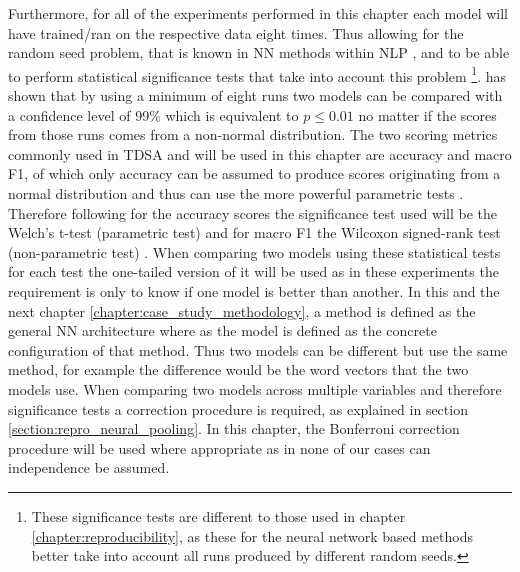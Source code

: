Furthermore, for all of the experiments performed in this chapter each model will have trained/ran on the respective data eight times. Thus allowing for the random seed problem, that is known in NN methods within NLP \citep{reimers-gurevych-2017-reporting}, and to be able to perform statistical significance tests that take into account this problem \citep{reimers2018comparing}\footnote{These significance tests are different to those used in chapter \ref{chapter:reproducibility}, as these for the neural network based methods better take into account all runs produced by different random seeds.}. \citet{reimers2018comparing} has shown that by using a minimum of eight runs two models can be compared with a confidence level of 99\% which is equivalent to $p \leq 0.01$ no matter if the scores from those runs comes from a non-normal distribution. The two scoring metrics commonly used in TDSA and will be used in this chapter are accuracy and macro F1, of which only accuracy can be assumed to produce scores originating from a normal distribution and thus can use the more powerful parametric tests \citep{dror-etal-2018-hitchhikers}. Therefore following \citet{reimers2018comparing} for the accuracy scores the significance test used will be the Welch's t-test (parametric test) \citep{welch1947generalization} and for macro F1 the Wilcoxon signed-rank test (non-parametric test) \citep{wilcoxon1992individual}. When comparing two models using these statistical tests for each test the one-tailed version of it will be used as in these experiments the requirement is only to know if one model is better than another. In this and the next chapter \ref{chapter:case_study_methodology}, a method is defined as the general NN architecture where as the model is defined as the concrete configuration of that method. Thus two models can be different but use the same method, for example the difference would be the word vectors that the two models use. When comparing two models across multiple variables and therefore significance tests a correction procedure is required, as explained in section \ref{section:repro_neural_pooling}. In this chapter, the Bonferroni correction procedure will be used where appropriate as in none of our cases can independence be assumed.


